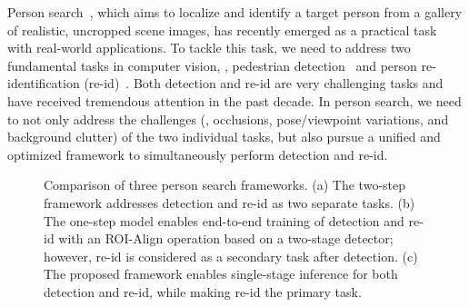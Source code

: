 \documentclass[final]{cvpr}
\begin{document}
Person search~\cite{DBLP:conf/cvpr/ZhengZSCYT17,DBLP:conf/cvpr/XiaoLWLW17}, which aims to localize and identify a target person from a gallery of realistic, uncropped scene images, has recently emerged as a practical task with real-world applications. To tackle this task, we need to address two fundamental tasks in computer vision, \ie, pedestrian detection~\cite{DBLP:conf/iccv/OuyangW13,DBLP:conf/cvpr/ZhangBS17} and person re-identification (re-id)~\cite{DBLP:conf/cvpr/FarenzenaBPMC10,DBLP:conf/cvpr/AhmedJM15}. Both detection and re-id are very challenging tasks and have received tremendous attention in the past decade. In person search, we need to not only address the challenges (\eg, occlusions, pose/viewpoint variations, and background clutter) of the two individual tasks, but also pursue a unified and optimized framework to simultaneously perform detection and re-id.

\begin{figure}[t]
\setlength{\abovecaptionskip}{1mm}
 \vspace{-2mm}
 \vspace{-2mm}
 \caption{Comparison of three person search frameworks. (a) The two-step framework addresses detection and re-id as two separate tasks. (b) The one-step model enables end-to-end training of detection and re-id with an ROI-Align operation based on a two-stage detector; however, re-id is considered as a secondary task after detection. (c) The proposed framework enables single-stage inference for both detection and re-id, while making re-id the primary task.}
 \label{fig:intro}
 \vspace{-6mm}
\end{figure}
\end{document}
